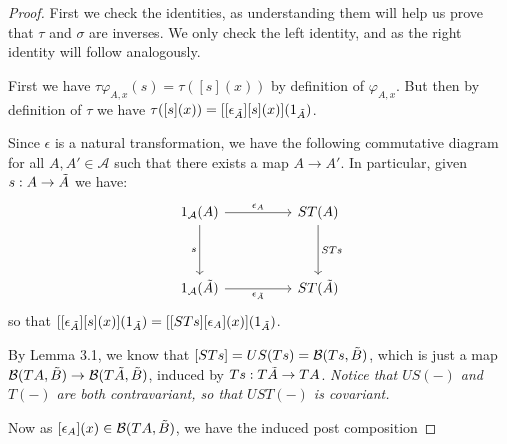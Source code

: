 \documentclass[12pt,a4paper]{article}
\def\HomB{\ensuremath\mathcal{B}}
\def\t{\ensuremath\tilde}
\begin{document}
\begin{proof}
	First we check the identities, as understanding them will help us prove that $\tau$ and $\sigma$ are inverses. We only check the left identity, and as the right identity will follow analogously. 
	
	First we have $\tau \varphi_{A,x}(s) = \tau([s](x))$ by definition of $\varphi_{A,x}$. But then by definition of $\tau$ we have $\tau([s](x)) = [[\epsilon_{\t A}][s](x)](1_{\t A})$. 
	
	Since $\epsilon$ is a natural transformation, we have the following commutative diagram for all $A, A' \in \mathcal{A}$ such that there exists a map $A \to A'$. In particular, given $s: A \to \t A$ we have:
\[\begin{tikzcd}
	{1_\mathcal{A}(A)} && {ST(A)} \\
	\\
	{1_\mathcal{A}(\t A)} && {ST(\t A)}
	\arrow["{\epsilon_A}", from=1-1, to=1-3]
	\arrow["s"', from=1-1, to=3-1]
	\arrow["STs", from=1-3, to=3-3]
	\arrow["{\epsilon_{\t A}}"', from=3-1, to=3-3]
\end{tikzcd}\]
so that $[[\epsilon_{\t A}][s](x)](1_{\t A}) = [[STs][\epsilon_A](x)](1_{\t A})$. 

By Lemma 3.1, we know that $[STs] = US(Ts)  = \HomB(Ts, \t B)$, which is just a map  $\HomB(TA, \t B) \to \HomB(T\t A, \t B)$, induced by $Ts: T\t A \to TA$. \emph{Notice that $US(-)$ and $T(-)$ are both contravariant, so that $UST(-)$ is covariant. }

Now as  $[\epsilon_A](x) \in \HomB(TA, \t B)$, we have the induced post composition


\end{proof}
\end{document}
